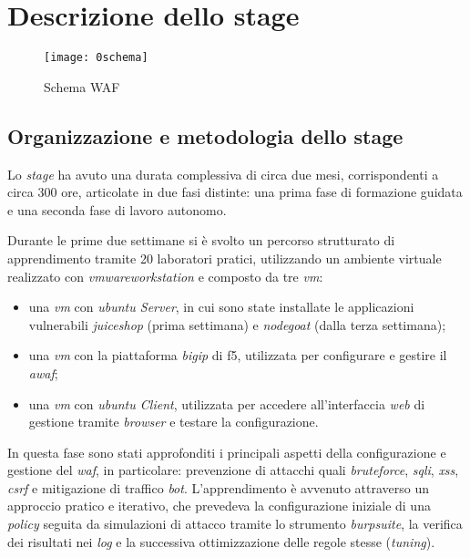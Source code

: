 \chapter{Descrizione dello stage}
\label{cap:descrizione-stage}


\begin{figure}[!h]
    \centering
    \texttt{[image: 0schema]}
    \caption{Schema WAF}
\end{figure}

\section{Organizzazione e metodologia dello stage}

Lo \emph{stage} ha avuto una durata complessiva di circa due mesi, corrispondenti a circa 300 ore, articolate in due fasi distinte: una prima fase di formazione guidata e una seconda fase di lavoro autonomo.

Durante le prime due settimane si è svolto un percorso strutturato di apprendimento tramite 20 laboratori pratici, utilizzando un ambiente virtuale realizzato con \emph{\gls{vmwareworkstation}} e composto da tre \emph{\gls{vm}}:

\begin{itemize}
    \item una \emph{\gls{vm}} con \emph{\gls{ubuntu} Server}, in cui sono state installate le applicazioni vulnerabili \emph{\gls{juiceshop}} (prima settimana) e \emph{\gls{nodegoat}} (dalla terza settimana);
    \item una \emph{\gls{vm}} con la piattaforma \emph{\gls{bigip}} di \gls{f5}, utilizzata per configurare e gestire il \emph{\gls{awaf}};
    \item una \emph{\gls{vm}} con \emph{\gls{ubuntu} Client}, utilizzata per accedere all'interfaccia \emph{web} di gestione tramite \emph{browser} e testare la configurazione.
\end{itemize}

In questa fase sono stati approfonditi i principali aspetti della configurazione e gestione del \emph{\gls{waf}}, in particolare: prevenzione di attacchi quali \emph{\gls{bruteforce}}, \emph{\gls{sqli}}, \emph{\gls{xss}}, \emph{\gls{csrf}} e mitigazione di traffico \emph{\gls{bot}}. L'apprendimento è avvenuto attraverso un approccio pratico e iterativo, che prevedeva la configurazione iniziale di una \emph{\gls{policy}} seguita da simulazioni di attacco tramite lo strumento \emph{\gls{burpsuite}}, la verifica dei risultati nei \emph{\gls{log}} e la successiva ottimizzazione delle regole stesse (\emph{\gls{tuning}}).

